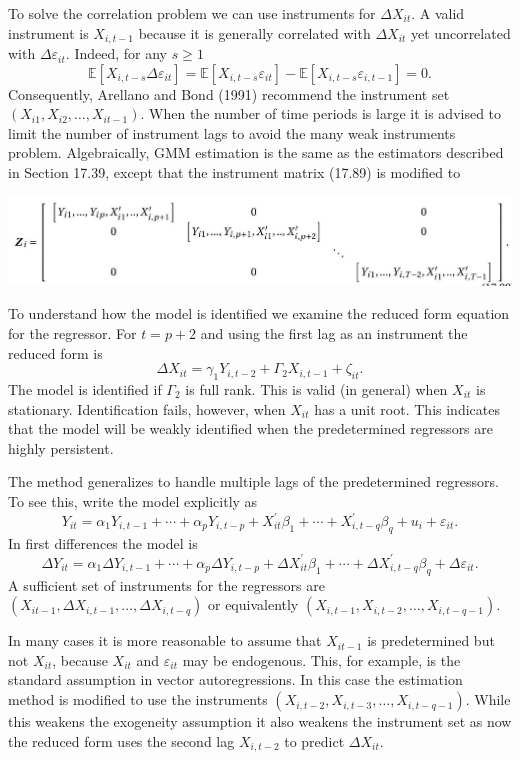 \documentclass[10pt]{article}
\begin{document}
To solve the correlation problem we can use instruments for $\Delta X_{i t}$. A valid instrument is $X_{i, t-1}$ because it is generally correlated with $\Delta X_{i t}$ yet uncorrelated with $\Delta \varepsilon_{i t}$. Indeed, for any $s \geq 1$
$$
\mathbb{E}\left[X_{i, t-s} \Delta \varepsilon_{i t}\right]=\mathbb{E}\left[X_{i, t-s} \varepsilon_{i t}\right]-\mathbb{E}\left[X_{i, t-s} \varepsilon_{i, t-1}\right]=0 .
$$
Consequently, Arellano and Bond (1991) recommend the instrument set $\left(X_{i 1}, X_{i 2}, \ldots, X_{i t-1}\right)$. When the number of time periods is large it is advised to limit the number of instrument lags to avoid the many weak instruments problem. Algebraically, GMM estimation is the same as the estimators described in Section 17.39, except that the instrument matrix (17.89) is modified to

\includegraphics[max width=\textwidth]{2022_10_23_acbfcce1ea7ce1901e2dg-46}

To understand how the model is identified we examine the reduced form equation for the regressor. For $t=p+2$ and using the first lag as an instrument the reduced form is
$$
\Delta X_{i t}=\gamma_{1} Y_{i, t-2}+\Gamma_{2} X_{i, t-1}+\zeta_{i t} .
$$
The model is identified if $\Gamma_{2}$ is full rank. This is valid (in general) when $X_{i t}$ is stationary. Identification fails, however, when $X_{i t}$ has a unit root. This indicates that the model will be weakly identified when the predetermined regressors are highly persistent.

The method generalizes to handle multiple lags of the predetermined regressors. To see this, write the model explicitly as
$$
Y_{i t}=\alpha_{1} Y_{i, t-1}+\cdots+\alpha_{p} Y_{i, t-p}+X_{i t}^{\prime} \beta_{1}+\cdots+X_{i, t-q}^{\prime} \beta_{q}+u_{i}+\varepsilon_{i t} .
$$
In first differences the model is
$$
\Delta Y_{i t}=\alpha_{1} \Delta Y_{i, t-1}+\cdots+\alpha_{p} \Delta Y_{i, t-p}+\Delta X_{i t}^{\prime} \beta_{1}+\cdots+\Delta X_{i, t-q}^{\prime} \beta_{q}+\Delta \varepsilon_{i t} .
$$
A sufficient set of instruments for the regressors are $\left(X_{i t-1}, \Delta X_{i, t-1}, \ldots, \Delta X_{i, t-q}\right)$ or equivalently $\left(X_{i, t-1}, X_{i, t-2}, \ldots, X_{i, t-q-1}\right)$.

In many cases it is more reasonable to assume that $X_{i t-1}$ is predetermined but not $X_{i t}$, because $X_{i t}$ and $\varepsilon_{i t}$ may be endogenous. This, for example, is the standard assumption in vector autoregressions. In this case the estimation method is modified to use the instruments $\left(X_{i, t-2}, X_{i, t-3}, \ldots, X_{i, t-q-1}\right)$. While this weakens the exogeneity assumption it also weakens the instrument set as now the reduced form uses the second lag $X_{i, t-2}$ to predict $\Delta X_{i t}$.
\end{document}
